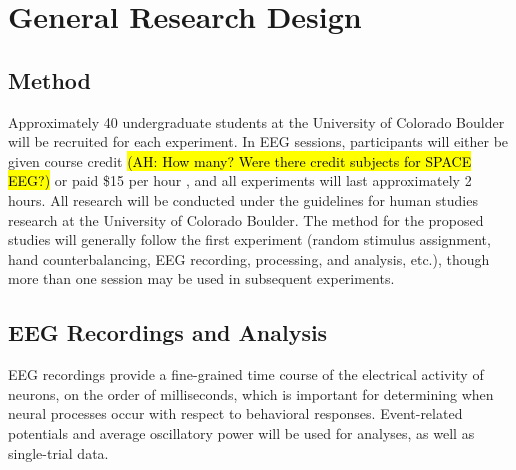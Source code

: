 
\section{General Research Design}

\subsection{Method}



Approximately 40 undergraduate students at the University of Colorado Boulder will be recruited for each experiment.  In EEG sessions, participants will either be given course credit \hl{(AH: How many? Were there credit subjects for SPACE EEG?)} or paid \$15 per hour , and all experiments will last approximately 2 hours.  All research will be conducted under the guidelines for human studies research at the University of Colorado Boulder.  The method for the proposed studies will generally follow the first experiment (random stimulus assignment, hand counterbalancing, EEG recording, processing, and analysis, etc.), though more than one session may be used in subsequent experiments.


\subsection{EEG Recordings and Analysis}

EEG recordings provide a fine-grained time course of the electrical
activity of neurons, on the order of milliseconds, which is important
for determining when neural processes occur with respect to behavioral
responses.  Event-related potentials and average oscillatory power will be used for analyses, as well as single-trial data.

